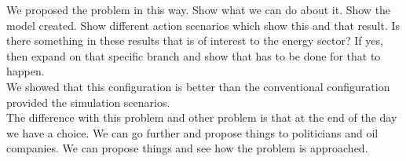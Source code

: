\documentclass[12pt]{article}
\begin{document}
We proposed the problem in this way. Show what we can do about it. Show the model created. Show different action scenarios which show this and that result. Is there something in these results that is of interest to the energy sector? If yes, then expand on that specific branch and show that has to be done for that to happen.\\  

We showed that this configuration is better than the conventional configuration provided the simulation scenarios. \\

The difference with this problem and other problem is that at the end of the day we have a choice. We can go further and propose things to politicians and oil companies. We can propose things and see how the problem is approached. 
\end{document}
